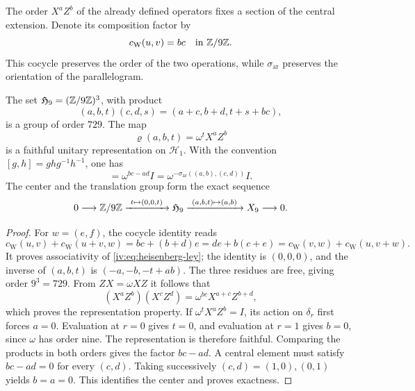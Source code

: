 The order \(X^aZ^b\) of the already defined operators fixes a section
of the central extension. Denote its composition factor by
\begin{equation}
 c_{\mathrm W}(u,v)=bc\quad\text{in }\mathbb Z/9\mathbb Z.
 \label{iv:eq:weyl-cociclo-polarizado}
\end{equation}
This cocycle preserves the order of the two operations, while
\(\sigma_{\mathrm{ar}}\) preserves the orientation of the parallelogram.

\begin{proposition}
\label{iv:prop:heisenberg-orientado}
The set \(\mathfrak H_9=(\mathbb Z/9\mathbb Z)^3\), with product
\begin{equation}
 (a,b,t)(c,d,s)=(a+c,b+d,t+s+bc),
 \label{iv:eq:heisenberg-ley}
\end{equation}
is a group of order \(729\). The map
\[
 \varrho(a,b,t)=\omega^tX^aZ^b
\]
is a faithful unitary representation on \(\mathcal H_1\).
With the convention \([g,h]=ghg^{-1}h^{-1}\), one has
\begin{equation}
 [\varrho(a,b,0),\varrho(c,d,0)]
 =\omega^{bc-ad}I
 =\omega^{-\sigma_{\mathrm{ar}}((a,b),(c,d))}I.
 \label{iv:eq:weyl-conmutador-orientado}
\end{equation}
The center and the translation group form the exact sequence
\[
 0\longrightarrow\mathbb Z/9\mathbb Z
 \xrightarrow{\ t\mapsto(0,0,t)\ }\mathfrak H_9
 \xrightarrow{\ (a,b,t)\mapsto(a,b)\ }X_9
 \longrightarrow0.
\]
\end{proposition}
\begin{proof}
For \(w=(e,f)\), the cocycle identity reads
\[
 c_{\mathrm W}(u,v)+c_{\mathrm W}(u+v,w)
 =bc+(b+d)e
 =de+b(c+e)
 =c_{\mathrm W}(v,w)+c_{\mathrm W}(u,v+w).
\]
It proves associativity of \eqref{iv:eq:heisenberg-ley}; the identity
is \((0,0,0)\), and the inverse of \((a,b,t)\) is
\((-a,-b,-t+ab)\). The three residues are free, giving order
\(9^3=729\). From \(ZX=\omega XZ\) it follows that
\[
 (X^aZ^b)(X^cZ^d)=\omega^{bc}X^{a+c}Z^{b+d},
\]
which proves the representation property. If
\(\omega^tX^aZ^b=I\), its action on \(\delta_r\) first forces
\(a=0\). Evaluation at \(r=0\) gives \(t=0\), and
evaluation at \(r=1\) gives \(b=0\), since \(\omega\) has order
nine. The representation is therefore faithful. Comparing the
products in both orders gives the factor \(bc-ad\).
A central element must satisfy \(bc-ad=0\) for every \((c,d)\).
Taking successively \((c,d)=(1,0),(0,1)\) yields
\(b=a=0\). This identifies the center and proves exactness.
\end{proof}

